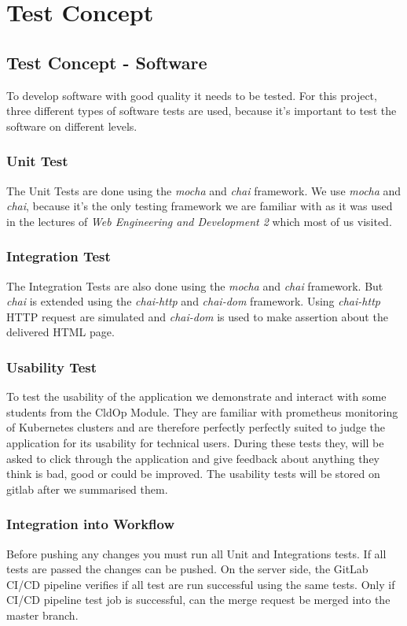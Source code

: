 \chapter{Test Concept}

\section{Test Concept - Software}
To develop software with good quality it needs to be tested.
For this project, three different types of software tests are used, because it's important to test the software on different levels.

\subsection{Unit Test}
The Unit Tests are done using the \textit{mocha} and \textit{chai} framework. We use \textit{mocha} and \textit{chai}, because it's the only testing framework we are familiar with as it was used in the lectures of \textit{Web Engineering and Development 2} which most of us visited.

\subsection{Integration Test}
The Integration Tests are also done using the \textit{mocha} and \textit{chai} framework.
But \textit{chai} is extended using the \textit{chai-http} and \textit{chai-dom} framework.
Using \textit{chai-http} HTTP request are simulated and \textit{chai-dom} is used to make assertion about the delivered HTML page.

\subsection{Usability Test}
To test the usability of the application we demonstrate and interact with some students from the CldOp Module.
They are familiar with prometheus monitoring of Kubernetes clusters and are therefore perfectly perfectly suited to judge the application for its usability for technical users.
During these tests they, will be asked to click through the application
and give feedback about anything they think is bad, good or could be improved.
The usability tests will be stored on gitlab after we summarised them.

\subsection{Integration into Workflow}
Before pushing any changes you must run all Unit and Integrations tests.
If all tests are passed the changes can be pushed.
On the server side, the GitLab CI/CD pipeline verifies if all test are run successful using the same tests.
Only if CI/CD pipeline test job is successful, can the merge request be merged into the master branch.

